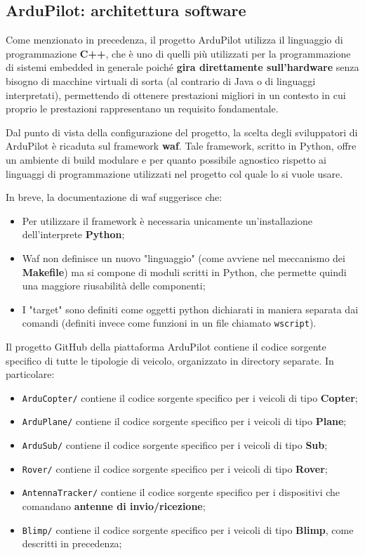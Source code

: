 \documentclass[a4paper, 12pt, oneside]{article}
\begin{document}
\subsection{ArduPilot: architettura software}
Come menzionato in precedenza, il progetto ArduPilot utilizza il linguaggio di programmazione \textbf{C++}, che è uno di quelli più utilizzati per la programmazione di sistemi embedded in generale poiché \textbf{gira direttamente sull'hardware} senza bisogno di macchine virtuali di sorta (al contrario di Java o di linguaggi interpretati), permettendo di ottenere prestazioni migliori in un contesto in cui proprio le prestazioni rappresentano un requisito fondamentale.

Dal punto di vista della configurazione del progetto, la scelta degli sviluppatori di ArduPilot è ricaduta sul framework \textbf{waf}. Tale framework, scritto in Python, offre un ambiente di build modulare e per quanto possibile agnostico rispetto ai linguaggi di programmazione utilizzati nel progetto col quale lo si vuole usare.

In breve, la documentazione di waf \cite{waf} suggerisce che:

\begin{itemize}
    \item Per utilizzare il framework è necessaria unicamente un'installazione dell'interprete \textbf{Python};
    \item Waf non definisce un nuovo "linguaggio" (come avviene nel meccanismo dei \textbf{Makefile}) ma si compone di moduli scritti in Python, che permette quindi una maggiore riusabilità delle componenti;
    \item I "target" sono definiti come oggetti python dichiarati in maniera separata dai comandi (definiti invece come funzioni in un file chiamato \texttt{wscript}).
\end{itemize}

Il progetto GitHub della piattaforma ArduPilot contiene il codice sorgente specifico di tutte le tipologie di veicolo, organizzato in directory separate. In particolare:

\begin{itemize}
    \item \texttt{ArduCopter/} contiene il codice sorgente specifico per i veicoli di tipo \textbf{Copter};
    \item \texttt{ArduPlane/} contiene il codice sorgente specifico per i veicoli di tipo \textbf{Plane};
    \item \texttt{ArduSub/} contiene il codice sorgente specifico per i veicoli di tipo \textbf{Sub};
    \item \texttt{Rover/} contiene il codice sorgente specifico per i veicoli di tipo \textbf{Rover};
    \item \texttt{AntennaTracker/} contiene il codice sorgente specifico per i dispositivi che comandano \textbf{antenne di invio/ricezione};
    \item \texttt{Blimp/} contiene il codice sorgente specifico per i veicoli di tipo \textbf{Blimp}, come descritti in precedenza;
\end{itemize}
\end{document}
